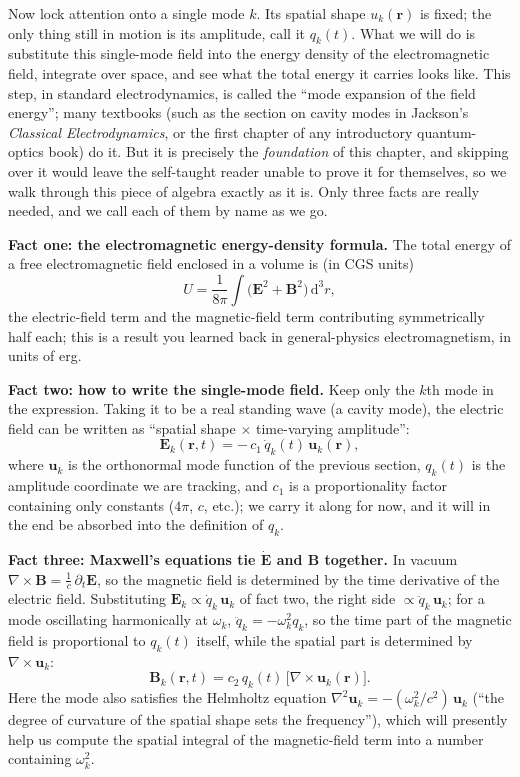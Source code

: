 Now lock attention onto a single mode \(k\). Its spatial shape \(u_k(\bm r)\) is fixed; the only thing still in motion is its amplitude, call it \(q_k(t)\). What we will do is substitute this single-mode field into the energy density of the electromagnetic field, integrate over space, and see what the total energy it carries looks like. This step, in standard electrodynamics, is called the ``mode expansion of the field energy''; many textbooks (such as the section on cavity modes in Jackson's \emph{Classical Electrodynamics}, or the first chapter of any introductory quantum-optics book) do it. But it is precisely the \emph{foundation} of this chapter, and skipping over it would leave the self-taught reader unable to prove it for themselves, so we walk through this piece of algebra exactly as it is. Only three facts are really needed, and we call each of them by name as we go.

\textbf{Fact one: the electromagnetic energy-density formula.} The total energy of a free electromagnetic field enclosed in a volume is (in CGS units)
\[
  U=\frac{1}{8\pi}\int\big(\bm E^2+\bm B^2\big)\,\mathrm d^3r,
\]
the electric-field term and the magnetic-field term contributing symmetrically half each; this is a result you learned back in general-physics electromagnetism, in units of erg.

\textbf{Fact two: how to write the single-mode field.} Keep only the \(k\)th mode in the expression. Taking it to be a real standing wave (a cavity mode), the electric field can be written as ``spatial shape \(\times\) time-varying amplitude'':
\[
  \bm E_k(\bm r,t)=-\,c_1\,\dot q_k(t)\,\bm u_k(\bm r),
\]
where \(\bm u_k\) is the orthonormal mode function of the previous section, \(q_k(t)\) is the amplitude coordinate we are tracking, and \(c_1\) is a proportionality factor containing only constants (\(4\pi\), \(c\), etc.); we carry it along for now, and it will in the end be absorbed into the definition of \(q_k\).

\textbf{Fact three: Maxwell's equations tie \(\dot{\bm E}\) and \(\bm B\) together.} In vacuum \(\nabla\times\bm B=\tfrac1c\,\partial_t\bm E\), so the magnetic field is determined by the time derivative of the electric field. Substituting \(\bm E_k\propto\dot q_k\,\bm u_k\) of fact two, the right side \(\propto\ddot q_k\,\bm u_k\); for a mode oscillating harmonically at \(\omega_k\), \(\ddot q_k=-\omega_k^2 q_k\), so the time part of the magnetic field is proportional to \(q_k(t)\) itself, while the spatial part is determined by \(\nabla\times\bm u_k\):
\[
  \bm B_k(\bm r,t)=c_2\,q_k(t)\,\big[\nabla\times\bm u_k(\bm r)\big].
\]
Here the mode also satisfies the Helmholtz equation \(\nabla^2\bm u_k=-(\omega_k^2/c^2)\,\bm u_k\) (``the degree of curvature of the spatial shape sets the frequency''), which will presently help us compute the spatial integral of the magnetic-field term into a number containing \(\omega_k^2\).

